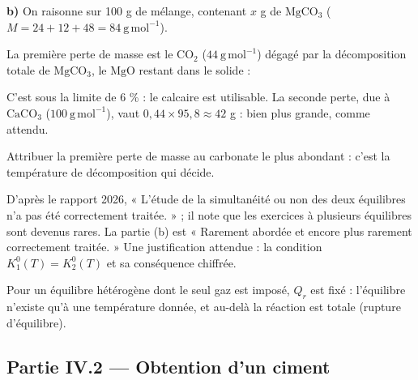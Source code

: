 \documentclass[11pt,a4paper]{article}
\newcommand{\equationajustee}[1]{%
  \sbox{\boiteequation}{$\displaystyle #1$}%
  \ifdim\wd\boiteequation>\linewidth
    \[\resizebox{\linewidth}{!}{\usebox{\boiteequation}}\]%
  \else
    \[#1\]%
  \fi}
\begin{document}
\textbf{b)} On raisonne sur 100 g de mélange, contenant \(x\) g de \(\mathrm{MgCO_3}\) (\(M=24+12+48=84\ \mathrm{g\,mol^{-1}}\)).

La première perte de masse est le \(\mathrm{CO_2}\) (\(44\ \mathrm{g\,mol^{-1}}\)) dégagé par la décomposition totale de \(\mathrm{MgCO_3}\), le \(\mathrm{MgO}\) restant dans le solide :

\equationajustee{\begin{aligned}
\frac{44\,x}{84}&=2{,}2\\
x&=\boxed{4{,}2\,\%}
\end{aligned}}

C'est sous la limite de 6 \% : le calcaire est utilisable. La seconde perte, due à \(\mathrm{CaCO_3}\) (\(100\ \mathrm{g\,mol^{-1}}\)), vaut \(0{,}44\times95{,}8\approx42\) g : bien plus grande, comme attendu.

\begin{piege}

Attribuer la première perte de masse au carbonate le plus abondant : c'est la température de décomposition qui décide.

\end{piege}

\begin{jury}

D'après le rapport 2026, « L'étude de la simultanéité ou non des deux équilibres n'a pas été correctement traitée. » ; il note que les exercices à plusieurs équilibres sont devenus rares. La partie (b) est « Rarement abordée et encore plus rarement correctement traitée. » Une justification attendue : la condition \(K_1^0(T)=K_2^0(T)\) et sa conséquence chiffrée.

\end{jury}

\begin{methode}

Pour un équilibre hétérogène dont le seul gaz est imposé, \(Q_r\) est fixé : l'équilibre n'existe qu'à une température donnée, et au-delà la réaction est totale (rupture d'équilibre).

\end{methode}

\hypertarget{partie-iv.2-obtention-dun-ciment}{%
\subsection{Partie IV.2 --- Obtention d'un ciment}\label{partie-iv.2-obtention-dun-ciment}}
\end{document}
